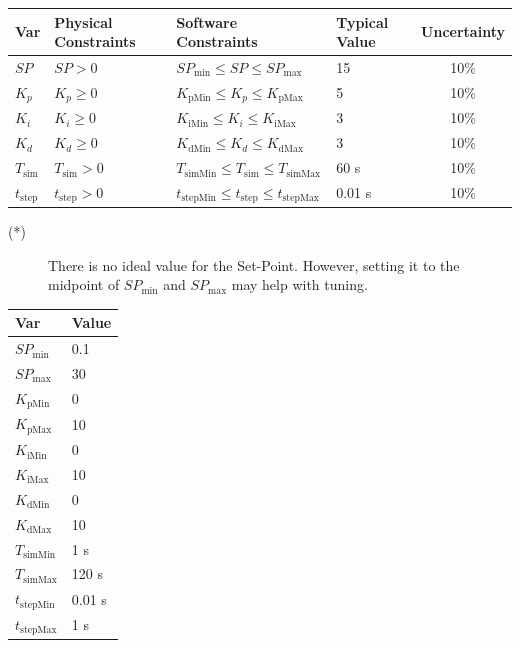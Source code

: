 \documentclass[12pt]{article}
\begin{document}
\begin{table}[!h]
  \caption{Input Variables} \label{TblInputVar}
  \renewcommand{\arraystretch}{1.2}
\noindent \begin{longtable*}{l l l l c} 
  \toprule
  \textbf{Var} & \textbf{Physical Constraints} & \textbf{Software Constraints} &
                             \textbf{Typical Value} & \textbf{Uncertainty}\\
  \midrule 
  $SP$ & $SP > 0$ & $SP_{\text{min}} \leq SP \leq SP_{\text{max}}$ & 
  15 & 10\%
  \\
  $K_p$ & $K_p \geq 0$ & $K_\text{pMin} \leq K_p \leq K_\text{pMax}$ & 
  5 & 10\%
  \\
  $K_i$ & $K_i \geq 0$ & $K_{\text{iMin}} \leq K_i \leq K_{\text{iMax}}$ & 
  3 & 10\%
  \\
  $K_d$ & $K_d \geq 0$ & $K_{\text{dMin}} \leq K_d \leq K_{\text{dMax}}$ & 
  3 & 10\%
  \\
  $T_\text{sim}$ & $T_\text{sim} > 0$ & $T_\text{simMin} \leq T_\text{sim} \leq 
  T_\text{simMax}$ & 60 \si[per-mode=symbol] {\second} & 10\%
  \\
  $t_\text{step}$ & $t_\text{step} > 0$ & $t_\text{stepMin} \leq t_\text{step} 
  \leq t_\text{stepMax}$ & 0.01 \si[per-mode=symbol] {\second} & 10\%
  \\
  \bottomrule
\end{longtable*}
\end{table}

\noindent 
\begin{description}
\item[(*)] 
There is no ideal value for the Set-Point. However, setting it to the midpoint 
of $SP_{\text{min}}$ and $SP_{\text{max}}$ may help with tuning.
\end{description}


\begin{table}[!h]
\caption{Specification Parameter Values} \label{TblSpecParams}
\renewcommand{\arraystretch}{1.2}
\noindent \begin{longtable*}{l l} 
  \toprule
  \textbf{Var} & \textbf{Value} \\
  \midrule 
  $SP_{\text{min}}$ & 0.1\\
  $SP_{\text{max}}$ & 30\\
  $K_\text{pMin}$ & 0  \\
  $K_\text{pMax}$ & 10 \\
  $K_\text{iMin}$ & 0 \\
  $K_\text{iMax}$ & 10 \\
  $K_\text{dMin}$ & 0 \\
  $K_\text{dMax}$ & 10 \\
  $T_\text{simMin}$ & 1 \si{\second}\\
  $T_\text{simMax}$ & 120 \si{\second}\\
  $t_\text{stepMin}$ & 0.01 \si{\second}\\
  $t_\text{stepMax}$ & 1 \si{\second}\\
  \bottomrule
\end{longtable*}
\end{table}
\end{document}
